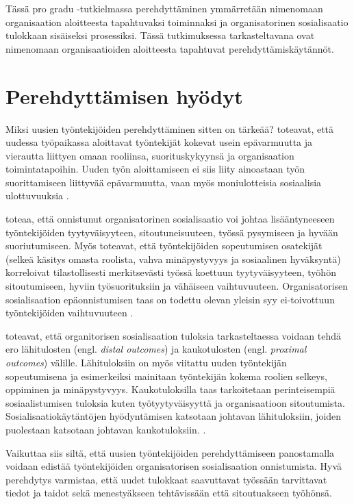 \documentclass[utf8]{gradu3}
\begin{document}
Tässä pro gradu -tutkielmassa perehdyttäminen ymmärretään nimenomaan organisaation aloitteesta tapahtuvaksi toiminnaksi ja organisatorinen sosialisaatio tulokkaan sisäiseksi prosessiksi. Tässä tutkimuksessa tarkasteltavana ovat nimenomaan organisaatioiden aloitteesta tapahtuvat perehdyttämiskäytännöt.


\section{Perehdyttämisen hyödyt}
\label{luku-perehdyttämisen-hyödyt}

Miksi uusien työntekijöiden perehdyttäminen sitten on tärkeää? \textcite{saks-gruman-2012} toteavat, että uudessa työpaikassa aloittavat työntekijät kokevat usein epävarmuutta ja vierautta liittyen omaan rooliinsa, suorituskykyynsä ja organisaation toimintatapoihin. Uuden työn aloittamiseen ei siis liity ainoastaan työn  suorittamiseen liittyvää epävarmuutta, vaan myös moniulotteisia sosiaalisia ulottuvuuksia \parencite{saks-gruman-2012}. 

\textcite{wanberg-2012} toteaa, että onnistunut organisatorinen sosialisaatio voi johtaa lisääntyneeseen työntekijöiden tyytyväisyyteen, sitoutuneisuuteen, työssä pysymiseen ja hyvään suoriutumiseen. Myös \textcite{bauer-ym-2007} toteavat, että työntekijöiden sopeutumisen osatekijät (selkeä käsitys omasta roolista, vahva minäpystyvyys ja sosiaalinen hyväksyntä) korreloivat tilastollisesti merkitsevästi työssä koettuun tyytyväisyyteen, työhön sitoutumiseen, hyviin työsuorituksiin ja vähäiseen vaihtuvuuteen. Organisatorisen sosialisaation epäonnistumisen taas on todettu olevan yleisin syy ei-toivottuun työntekijöiden vaihtuvuuteen \parencite{bauer-ym-1998}.

\textcite{saks-gruman-2012} toteavat, että organitorisen sosialisaation tuloksia tarkasteltaessa voidaan tehdä ero lähitulosten (engl. \textit{distal outcomes}) ja kaukotulosten (engl. \textit{proximal outcomes}) välille. Lähituloksiin on myös viitattu uuden työntekijän sopeutumisena ja esimerkeiksi mainitaan työntekijän kokema roolien selkeys, oppiminen ja minäpystyvyys. Kaukotuloksilla taas tarkoitetaan perinteisempiä sosiaalistumisen tuloksia kuten työtyytyväisyyttä ja organisaatioon sitoutumista. Sosialisaatiokäytäntöjen hyödyntämisen katsotaan johtavan lähituloksiin, joiden puolestaan katsotaan johtavan kaukotuloksiin. \parencite{saks-gruman-2012}.

Vaikuttaa siis siltä, että uusien työntekijöiden perehdyttämiseen panostamalla voidaan edistää työntekijöiden organisatorisen sosialisaation onnistumista. Hyvä perehdytys varmistaa, että uudet tulokkaat saavuttavat työssään tarvittavat tiedot ja taidot sekä menestyäkseen tehtävissään että sitoutuakseen työhönsä.
\end{document}
